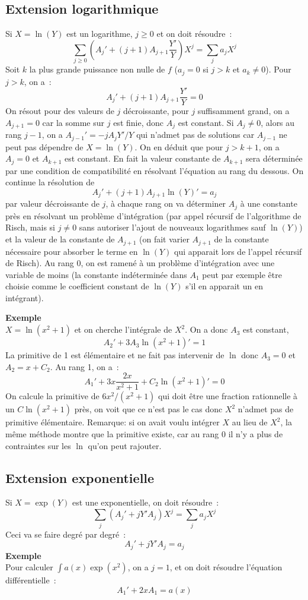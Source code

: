 \documentclass[a4paper,11pt]{book}
\begin{document}
\begin{giacjshere}
\subsection{Extension logarithmique}
Si $X=\ln(Y)$ est un logarithme, $j \geq 0$ et on doit résoudre~:
\[ \sum_{j\geq 0} (A_j'+(j+1)A_{j+1} \frac{Y'}{Y}) X^j = \sum_j a_j X^j \]
Soit $k$ la plus grande puissance non nulle de $f$ ($a_j=0$ 
si $j>k$ et $a_k\neq 0$). Pour $j>k$, on a~:
\[ A_j'+(j+1)A_{j+1} \frac{Y'}{Y}  =0 \]
On résout pour des valeurs de $j$ décroissante, pour $j$ suffisamment
grand, on a $A_{j+1}=0$ car la somme sur $j$ est finie, donc $A_j$
est constant. Si $A_j \neq 0$, alors au rang $j-1$, on a 
$A_{j-1} ' = -j A_j Y'/Y $ qui n'admet pas de solutions car 
$A_{j-1}$ ne peut pas dépendre de $X=\ln(Y)$. On en déduit que pour
$j>k+1$, on a $A_j=0$ et $A_{k+1}$ est constant. En fait la
valeur constante de $A_{k+1}$ sera déterminée par une condition
de compatibilité en résolvant l'équation au rang du dessous.
On continue la résolution de 
\[ A_j'+(j+1)A_{j+1} \ln(Y)'  = a_j \]
par valeur décroissante de $j$, à chaque
rang on va déterminer $A_j$ à une constante près en résolvant
un problème d'intégration (par appel récursif de l'algorithme
de Risch, mais si $j \neq 0$ sans autoriser l'ajout de nouveaux 
logarithmes sauf $\ln(Y)$)
et la valeur de la constante de $A_{j+1}$ (on fait varier $A_{j+1}$
de la constante nécessaire pour absorber le terme en $\ln(Y)$
qui apparait lors de l'appel récursif de Risch).
Au rang 0, on est ramené à un problème d'intégration avec
une variable de moins (la constante
indéterminée dans $A_1$ peut par exemple être choisie comme
le coefficient constant de $\ln(Y)$ s'il en apparait un en intégrant).

{\bf Exemple}\\
$X=\ln(x^2+1)$ et on cherche l'intégrale de $X^2$. On a donc $A_3$
est constant,
\[ A_2' + 3 A_3 \ln(x^2+1)' = 1\]
La primitive de 1 est élémentaire et ne fait pas intervenir de $\ln$
donc $A_3=0$ et $A_2=x+C_2$. Au rang 1, on a~:
\[A_1' + 3 x \frac{2x}{x^2+1} + C_2 \ln(x^2+1)' = 0\]
On calcule la primitive de $6x^2/(x^2+1)$ qui doit être une fraction
rationnelle à un $C\ln(x^2+1)$ près, on voit que ce n'est pas le cas
donc $X^2$ n'admet pas de primitive élémentaire.
Remarque: si on avait voulu intégrer $X$ au lieu de $X^2$, la même
méthode montre que la primitive existe, car au rang 0 il n'y
a plus de contraintes sur les $\ln$ qu'on peut rajouter.

\subsection{Extension exponentielle}
Si $X=\exp(Y)$ est une exponentielle, on doit résoudre~:
\[ \sum_{j} (A_j'+j Y'A_{j}) X^j = \sum_j a_j X^j \]
Ceci va se faire degré par degré~:
\begin{equation} \label{eq:rischdiffeq}
 A_j'+j Y' A_{j} = a_j
\end{equation}
{\bf Exemple}\\
Pour calculer $\int a(x) \exp(x^2)$, on a $j=1$, et on doit résoudre
l'équation différentielle~:
\[ A_1'+2xA_1= a(x)\]


\end{giacjshere}
\end{document}
